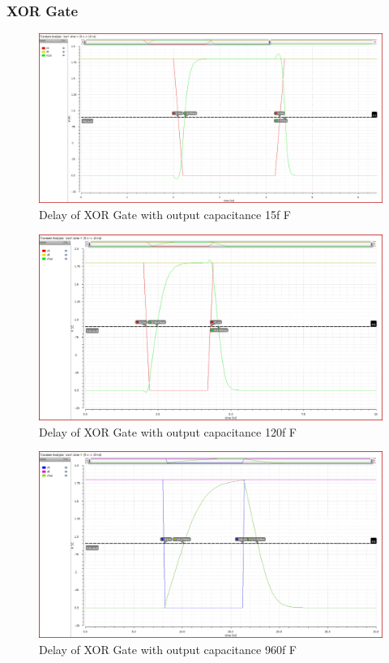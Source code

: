 \documentclass[conference]{IEEEtran}
\begin{document}
\subsubsection{XOR Gate}
\begin{figure}[h!]
    \centering
    \includegraphics[width=0.9\linewidth]{xor2_C1.png}
    \caption{Delay of XOR Gate with output capacitance 15f F}
\end{figure}

\begin{figure}[h!]
    \centering
    \includegraphics[width=0.9\linewidth]{xor2_C2.png}
    \caption{Delay of XOR Gate with output capacitance 120f F}
\end{figure}

\begin{figure}[h!]
    \centering
    \includegraphics[width=0.9\linewidth]{xor2_C3.png}
    \caption{Delay of XOR Gate with output capacitance 960f F}
\end{figure}
\end{document}
